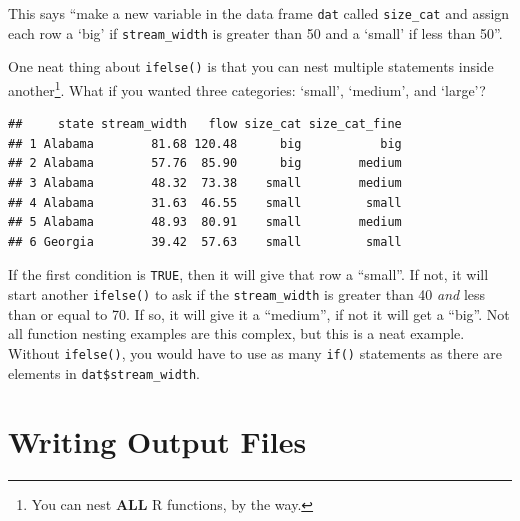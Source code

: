 \documentclass[]{book}
\newenvironment{Shaded}{\begin{snugshade}}{\end{snugshade}}
\newcommand{\KeywordTok}[1]{\textcolor[rgb]{0.13,0.29,0.53}{\textbf{#1}}}
\newcommand{\DecValTok}[1]{\textcolor[rgb]{0.00,0.00,0.81}{#1}}
\newcommand{\StringTok}[1]{\textcolor[rgb]{0.31,0.60,0.02}{#1}}
\newcommand{\OperatorTok}[1]{\textcolor[rgb]{0.81,0.36,0.00}{\textbf{#1}}}
\newcommand{\NormalTok}[1]{#1}
\let\rmarkdownfootnote\footnote%
\def\footnote{\protect\rmarkdownfootnote}
\theoremstyle{definition}
\theoremstyle{definition}
\theoremstyle{definition}
\theoremstyle{remark}
\begin{document}
This says ``make a new variable in the data frame \texttt{dat} called
\texttt{size\_cat} and assign each row a `big' if \texttt{stream\_width}
is greater than 50 and a `small' if less than 50''.

One neat thing about \texttt{ifelse()} is that you can nest multiple
statements inside another\footnote{You can nest \textbf{ALL} R
  functions, by the way.}. What if you wanted three categories: `small',
`medium', and `large'?

\begin{Shaded}
\end{Shaded}

\begin{verbatim}
##     state stream_width   flow size_cat size_cat_fine
## 1 Alabama        81.68 120.48      big           big
## 2 Alabama        57.76  85.90      big        medium
## 3 Alabama        48.32  73.38    small        medium
## 4 Alabama        31.63  46.55    small         small
## 5 Alabama        48.93  80.91    small        medium
## 6 Georgia        39.42  57.63    small         small
\end{verbatim}

If the first condition is \texttt{TRUE}, then it will give that row a
``small''. If not, it will start another \texttt{ifelse()} to ask if the
\texttt{stream\_width} is greater than 40 \emph{and} less than or equal
to 70. If so, it will give it a ``medium'', if not it will get a
``big''. Not all function nesting examples are this complex, but this is
a neat example. Without \texttt{ifelse()}, you would have to use as many
\texttt{if()} statements as there are elements in
\texttt{dat\$stream\_width}.

\section{Writing Output Files}\label{writing-output-files}
\end{document}
